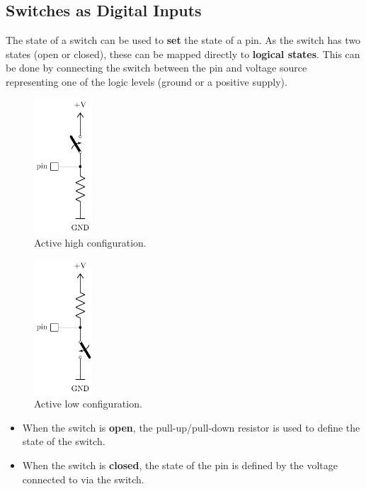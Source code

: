 \documentclass[a4paper]{report}
\begin{document}
\subsection{Switches as Digital Inputs}
The state of a switch can be used to \textbf{set} the state of a pin.
As the switch has two states (open or closed), these can be mapped directly to
\textbf{logical states}.
This can be done by connecting the switch between the pin and voltage source
representing one of the logic levels (ground or a positive supply).
\pagebreak
\begin{multicols}{2}
    \begin{figure}[H]
        \centering
        \includegraphics[height = 5cm, keepaspectratio = true]{figures/active_high_switch.pdf}
        \caption{Active high configuration.} %
    \end{figure}
    \begin{figure}[H]
        \centering
        \includegraphics[height = 5cm, keepaspectratio = true]{figures/active_low_switch.pdf}
        \caption{Active low configuration.} %
    \end{figure}
\end{multicols}
\begin{itemize}
    \item When the switch is \textbf{open}, the pull-up/pull-down resistor is used to define the state of the switch.
    \item When the switch is \textbf{closed}, the state of the pin is defined by the voltage connected to via the switch.
\end{itemize}
\end{document}
